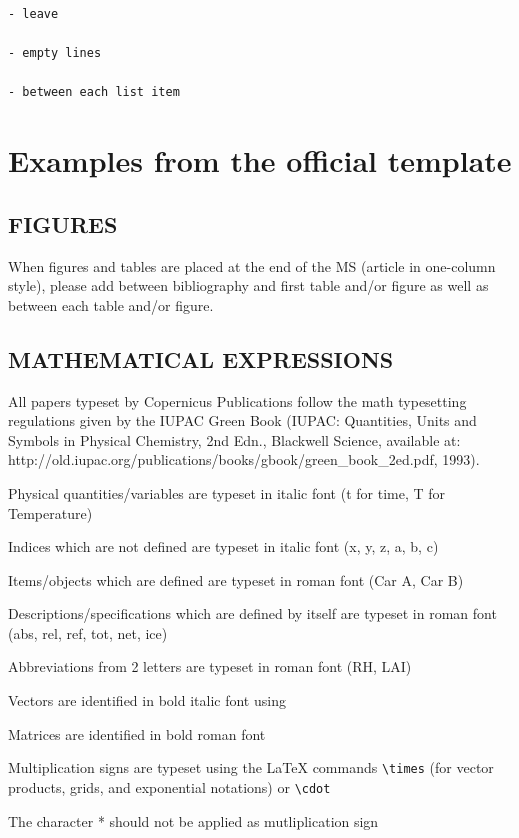 \documentclass[gmd, manuscript]{copernicus}
\begin{document}
\begin{verbatim}
- leave

- empty lines

- between each list item
\end{verbatim}

\section{Examples from the official template}

\subsection{FIGURES}

When figures and tables are placed at the end of the MS (article in
one-column style), please add \clearpage between bibliography and first
table and/or figure as well as between each table and/or figure.

\subsection{MATHEMATICAL EXPRESSIONS}

All papers typeset by Copernicus Publications follow the math
typesetting regulations given by the IUPAC Green Book (IUPAC:
Quantities, Units and Symbols in Physical Chemistry, 2nd Edn., Blackwell
Science, available at:
http://old.iupac.org/publications/books/gbook/green\_book\_2ed.pdf,
1993).

Physical quantities/variables are typeset in italic font (t for time, T
for Temperature)

Indices which are not defined are typeset in italic font (x, y, z, a, b,
c)

Items/objects which are defined are typeset in roman font (Car A, Car B)

Descriptions/specifications which are defined by itself are typeset in
roman font (abs, rel, ref, tot, net, ice)

Abbreviations from 2 letters are typeset in roman font (RH, LAI)

Vectors are identified in bold italic font using 

Matrices are identified in bold roman font

Multiplication signs are typeset using the LaTeX commands
\texttt{\textbackslash{}times} (for vector products, grids, and
exponential notations) or \texttt{\textbackslash{}cdot}

The character * should not be applied as mutliplication sign
\end{document}
